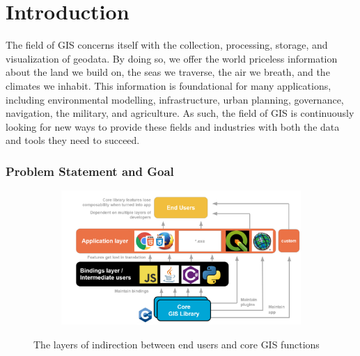 \chapter{Introduction}
\label{chap:intro}

\graphicspath{{../../assets/images/1/}}

The field of \ac{GIS} concerns itself with the collection, processing, storage, and visualization of geodata. 
By doing so, we offer the world priceless information about the land we build on, the seas we traverse, the air we breath, and the climates we inhabit. 
This information is foundational for many applications, including environmental modelling, infrastructure, urban planning, governance, navigation, the military, and agriculture.   
As such, the field of \ac{GIS} is continuously looking for new ways to provide these fields and industries with both the data and tools they need to succeed. 

\subsection*{Problem Statement and Goal}

\begin{figure}
  \centering
  \begin{subfigure}[b]{\linewidth}
    \includegraphics[width=\linewidth]{layers.png}
  \end{subfigure}%
  \caption{The layers of indirection between end users and core GIS functions}
  \label{fig:problem-statement}
\end{figure}

